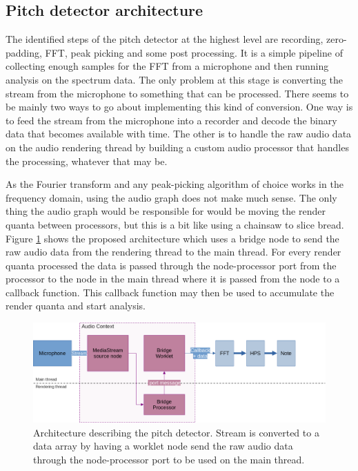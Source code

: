 \subsection{Pitch detector architecture}
The identified steps of the pitch detector at the highest level are recording, zero-padding, FFT, peak picking and some post processing. It is a simple pipeline of collecting enough samples for the FFT from a microphone and then running analysis on the spectrum data. The only problem at this stage is converting the stream from the microphone to something that can be processed. There seems to be mainly two ways to go about implementing this kind of conversion. One way is to feed the stream from the microphone into a recorder and decode the binary data that becomes available with time. The other is to handle the raw audio data on the audio rendering thread by building a custom audio processor that handles the processing, whatever that may be. 

As the Fourier transform and any peak-picking algorithm of choice works in the frequency domain, using the audio graph does not make much sense. The only thing the audio graph would be responsible for would be moving the render quanta between processors, but this is a bit like using a chainsaw to slice bread. Figure \ref{fig:pdArch} shows the proposed architecture which uses a bridge node to send the raw audio data from the rendering thread to the main thread. For every render quanta processed the data is passed through the node-processor port from the processor to the node in the main thread where it is passed from the node to a callback function. This callback function may then be used to accumulate the render quanta and start analysis.

\begin{figure}[ht]
    \centering
    \includegraphics[width=\textwidth]{./images/pdArchitecture.png}
    \caption{Architecture describing the pitch detector. Stream is converted to a data array by having a worklet node send the raw audio data through the node-processor port to be used on the main thread.\label{fig:pdArch}}
\end{figure}

